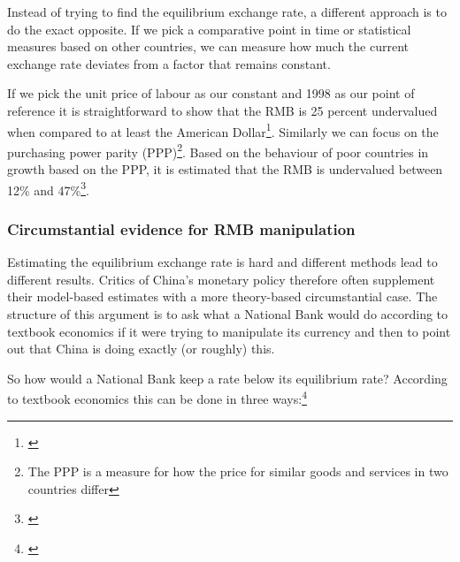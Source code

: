 \documentclass[11pt]{article}
\begin{document}
% 
Instead of trying to find the equilibrium exchange rate, a different 
approach is to do the exact opposite. If we pick a comparative point in 
time or statistical measures based on other countries, we can measure 
how much the current exchange rate deviates from a factor that remains 
constant.

If we pick the unit price of labour as our constant and 1998 as our 
point of reference it is straightforward to show that the RMB is 25 
percent undervalued when compared to at least the American 
Dollar\footnote{\cite{chimerica2009}}. Similarly we can focus on the 
purchasing power parity (PPP)\footnote{The PPP is a measure for how the 
price for similar goods and services in two countries differ}. Based on 
the behaviour of poor countries in growth based on the PPP, it is 
estimated that the RMB is undervalued between 12\% and 
47\%\footnote{\cite{Subramanian2010}}.



\subsubsection{Circumstantial evidence for RMB manipulation}

Estimating the equilibrium exchange rate is hard and different methods lead to different results. Critics of China's monetary policy therefore often supplement their model-based estimates with a more theory-based circumstantial case. The structure of this argument is to ask what a National Bank would do according to textbook economics if it were trying to manipulate its currency and then to point out that China is doing exactly (or roughly) this. 


So how would a National Bank keep a rate below its equilibrium rate? According to 
textbook economics this can be done in three ways:\footnote{\cite[pp. 
514]{Krugman2008}}
\end{document}
